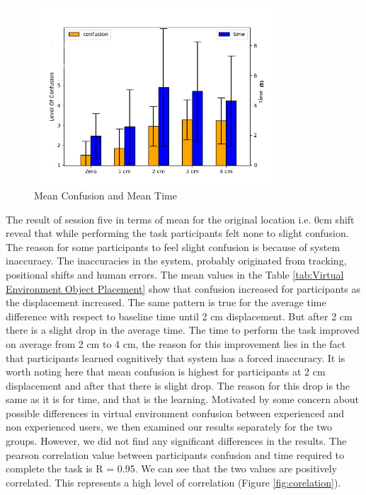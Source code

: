 \begin{figure}[h]
    \centering
    \includegraphics[width=0.8\textwidth]{./images/main_confusion.jpg}
    \caption{Mean Confusion and Mean Time}
    \label{fig:mean confusion}
\end{figure}
The result of session five in terms of mean for the original location i.e. 0cm shift reveal that while performing the task participants felt none to slight confusion. The reason for some participants to feel slight confusion is because of system inaccuracy. The inaccuracies in the system, probably originated from tracking, positional shifts and human errors. The mean values in the Table \ref{tab:Virtual Environment Object Placement} show that confusion increased for participants as the displacement increased. The same pattern is true for the average time difference with respect to baseline time until 2 cm displacement. But after 2
cm there is a slight drop in the average time. The time to perform the task improved on
average from 2 cm to 4 cm, the reason for this improvement lies in the fact that participants learned cognitively that system has a forced inaccuracy. It is worth noting here that mean confusion is highest for participants at 2 cm displacement and after that there is slight drop. The reason for this drop is the same as it is for time, and that is the learning. Motivated by some concern about possible differences in virtual environment confusion between experienced and non experienced users, we then examined our results separately for the two groups. However, we did not find any significant differences in the results. The pearson correlation value between participants confusion and time required to complete the task is R = 0.95. We can see that the two values are positively correlated. This represents a high level of correlation (Figure \ref{fig:corelation}).

